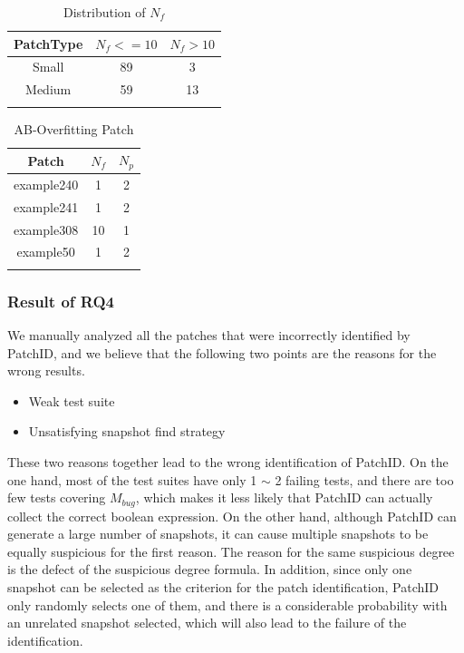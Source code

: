 \documentclass[sn-basic]{sn-jnl}
\theoremstyle{thmstyleone}
\theoremstyle{thmstyletwo}
\theoremstyle{thmstylethree}
\begin{document}
\begin{table}[ht]
	\begin{center}
		\begin{minipage}{173px}
			\caption{Distribution of $N_f$}\label{tab10}%
			\begin{tabular}{ccc}
				\toprule
				PatchType & $N_f<=10$ & $N_f>10$
				\\
				\midrule
				Small&	89&	3  \\
				Medium&	59&	13    \\
				\botrule
			\end{tabular}
		\end{minipage}
	\end{center}
\end{table}

\begin{table}[ht]
	\begin{center}
		\begin{minipage}{173px}
			\caption{AB-Overfitting Patch}\label{tab11}%
			\begin{tabular}{ccc}
				\toprule
				Patch&	$N_f$ &	$N_p$
				\\
				\midrule
				example240	&1&	2  \\
				example241&	1&	2   \\
				example308&	10&	1 \\
				example50&	1&	2\\
				\botrule
			\end{tabular}
		\end{minipage}
	\end{center}
\end{table}

\subsubsection{Result of RQ4}
We manually analyzed all the patches that were incorrectly identified by PatchID, and we believe that the following two points are the reasons for the wrong results.

\begin{itemize}
	\item Weak test suite
	\item Unsatisfying snapshot find strategy
\end{itemize}

These two reasons together lead to the wrong identification of PatchID. On the one hand, most of the test suites have only 1 $\sim$ 2 failing tests, and there are too few tests covering $M_{bug}$, which makes it less likely that PatchID can actually collect the correct boolean expression. On the other hand, although PatchID can generate a large number of snapshots, it can cause multiple snapshots to be equally suspicious for the first reason. The reason for the same suspicious degree is the defect of the suspicious degree formula. In addition, since only one snapshot can be selected as the criterion for the patch identification, PatchID only randomly selects one of them, and there is a considerable probability with an unrelated snapshot selected, which will also lead to the failure of the identification.
\end{document}
